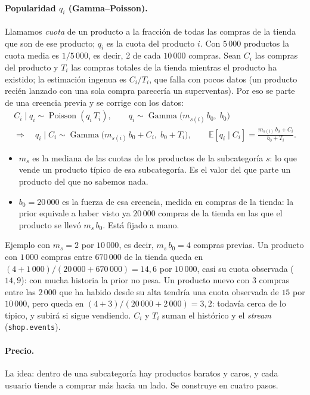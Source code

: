 \documentclass[11pt,a4paper]{article}
\newcommand{\E}{\mathbb{E}}
\newcommand{\Gam}{\operatorname{Gamma}}
\newcommand{\Poi}{\operatorname{Poisson}}
\newcommand{\cod}[1]{\texttt{#1}}
\begin{document}
\paragraph{Popularidad $q_i$ (Gamma--Poisson).} Llamamos \emph{cuota} de un producto a la fracción de
todas las compras de la tienda que son de ese producto; $q_i$ es la cuota del producto $i$. Con $5\,000$
productos la cuota media es $1/5\,000$, es decir, 2 de cada $10\,000$ compras. Sean $C_i$ las compras del
producto y $T_i$ las compras totales de la tienda mientras el producto ha existido; la estimación ingenua
es $C_i/T_i$, que falla con pocos datos (un producto recién lanzado con una sola compra parecería un
superventas). Por eso se parte de una creencia previa y se corrige con los datos:
\begin{gather*}
C_i\mid q_i\sim\Poi(q_i\,T_i),\qquad q_i\sim\Gam\big(m_{s(i)}\,b_0,\;b_0\big)\\
\Longrightarrow\quad q_i\mid C_i\sim\Gam\big(m_{s(i)}\,b_0+C_i,\;b_0+T_i\big),
\qquad \E[q_i\mid C_i]=\frac{m_{s(i)}\,b_0+C_i}{b_0+T_i}.
\end{gather*}
\begin{itemize}\setlength{\itemsep}{0.1em}
\item $m_s$ es la mediana de las cuotas de los productos de la subcategoría $s$: lo que vende un producto
típico de esa subcategoría. Es el valor del que parte un producto del que no sabemos nada.
\item $b_0=20\,000$ es la fuerza de esa creencia, medida en compras de la tienda: la prior equivale a haber
visto ya $20\,000$ compras de la tienda en las que el producto se llevó $m_s\,b_0$. Está fijado a mano.
\end{itemize}
Ejemplo con $m_s=2$ por $10\,000$, es decir, $m_s\,b_0=4$ compras previas. Un producto con $1\,000$ compras
entre $670\,000$ de la tienda queda en $(4+1\,000)/(20\,000+670\,000)=14{,}6$ por $10\,000$, casi su cuota
observada ($14{,}9$): con mucha historia la prior no pesa. Un producto nuevo con $3$ compras entre las
$2\,000$ que ha habido desde su alta tendría una cuota observada de $15$ por $10\,000$, pero queda en
$(4+3)/(20\,000+2\,000)=3{,}2$: todavía cerca de lo típico, y subirá si sigue vendiendo. $C_i$ y $T_i$
suman el histórico y el \emph{stream} (\cod{shop.events}).

\paragraph{Precio.} La idea: dentro de una subcategoría hay productos baratos y caros, y cada usuario
tiende a comprar más hacia un lado. Se construye en cuatro pasos.
\end{document}
